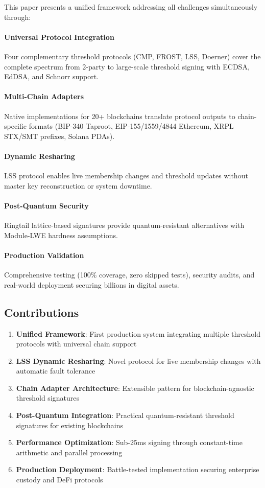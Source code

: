 \documentclass[11pt,twocolumn]{article}
\begin{document}
This paper presents a unified framework addressing all challenges simultaneously through:

\paragraph{Universal Protocol Integration} Four complementary threshold protocols (CMP, FROST, LSS, Doerner) cover the complete spectrum from 2-party to large-scale threshold signing with ECDSA, EdDSA, and Schnorr support.

\paragraph{Multi-Chain Adapters} Native implementations for 20+ blockchains translate protocol outputs to chain-specific formats (BIP-340 Taproot, EIP-155/1559/4844 Ethereum, XRPL STX/SMT prefixes, Solana PDAs).

\paragraph{Dynamic Resharing} LSS protocol enables live membership changes and threshold updates without master key reconstruction or system downtime.

\paragraph{Post-Quantum Security} Ringtail lattice-based signatures provide quantum-resistant alternatives with Module-LWE hardness assumptions.

\paragraph{Production Validation} Comprehensive testing (100\% coverage, zero skipped tests), security audits, and real-world deployment securing billions in digital assets.

\subsection{Contributions}

\begin{enumerate}
\item \textbf{Unified Framework}: First production system integrating multiple threshold protocols with universal chain support
\item \textbf{LSS Dynamic Resharing}: Novel protocol for live membership changes with automatic fault tolerance
\item \textbf{Chain Adapter Architecture}: Extensible pattern for blockchain-agnostic threshold signatures
\item \textbf{Post-Quantum Integration}: Practical quantum-resistant threshold signatures for existing blockchains
\item \textbf{Performance Optimization}: Sub-25ms signing through constant-time arithmetic and parallel processing
\item \textbf{Production Deployment}: Battle-tested implementation securing enterprise custody and DeFi protocols
\end{enumerate}
\end{document}
